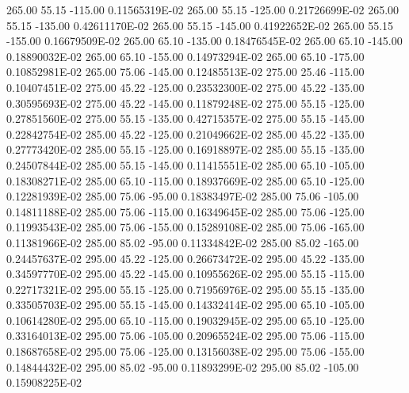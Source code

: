      265.00      55.15    -115.00      0.11565319E-02
     265.00      55.15    -125.00      0.21726699E-02
     265.00      55.15    -135.00      0.42611170E-02
     265.00      55.15    -145.00      0.41922652E-02
     265.00      55.15    -155.00      0.16679509E-02
     265.00      65.10    -135.00      0.18476545E-02
     265.00      65.10    -145.00      0.18890032E-02
     265.00      65.10    -155.00      0.14973294E-02
     265.00      65.10    -175.00      0.10852981E-02
     265.00      75.06    -145.00      0.12485513E-02
     275.00      25.46    -115.00      0.10407451E-02
     275.00      45.22    -125.00      0.23532300E-02
     275.00      45.22    -135.00      0.30595693E-02
     275.00      45.22    -145.00      0.11879248E-02
     275.00      55.15    -125.00      0.27851560E-02
     275.00      55.15    -135.00      0.42715357E-02
     275.00      55.15    -145.00      0.22842754E-02
     285.00      45.22    -125.00      0.21049662E-02
     285.00      45.22    -135.00      0.27773420E-02
     285.00      55.15    -125.00      0.16918897E-02
     285.00      55.15    -135.00      0.24507844E-02
     285.00      55.15    -145.00      0.11415551E-02
     285.00      65.10    -105.00      0.18308271E-02
     285.00      65.10    -115.00      0.18937669E-02
     285.00      65.10    -125.00      0.12281939E-02
     285.00      75.06     -95.00      0.18383497E-02
     285.00      75.06    -105.00      0.14811188E-02
     285.00      75.06    -115.00      0.16349645E-02
     285.00      75.06    -125.00      0.11993543E-02
     285.00      75.06    -155.00      0.15289108E-02
     285.00      75.06    -165.00      0.11381966E-02
     285.00      85.02     -95.00      0.11334842E-02
     285.00      85.02    -165.00      0.24457637E-02
     295.00      45.22    -125.00      0.26673472E-02
     295.00      45.22    -135.00      0.34597770E-02
     295.00      45.22    -145.00      0.10955626E-02
     295.00      55.15    -115.00      0.22717321E-02
     295.00      55.15    -125.00      0.71956976E-02
     295.00      55.15    -135.00      0.33505703E-02
     295.00      55.15    -145.00      0.14332414E-02
     295.00      65.10    -105.00      0.10614280E-02
     295.00      65.10    -115.00      0.19032945E-02
     295.00      65.10    -125.00      0.33164013E-02
     295.00      75.06    -105.00      0.20965524E-02
     295.00      75.06    -115.00      0.18687658E-02
     295.00      75.06    -125.00      0.13156038E-02
     295.00      75.06    -155.00      0.14844432E-02
     295.00      85.02     -95.00      0.11893299E-02
     295.00      85.02    -105.00      0.15908225E-02
